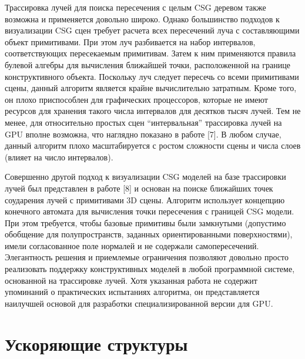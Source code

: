 Трассировка лучей для поиска пересечения с целым CSG деревом также возможна и применяется довольно широко. Однако большинство подходов к визуализации CSG сцен требует расчета всех пересечений луча с составляющими объект примитивами. При этом луч разбивается на набор интервалов, соответствующих пересекаемым примитивам. Затем к ним применяются правила булевой алгебры для вычисления ближайшей точки, расположенной на границе конструктивного объекта. Поскольку луч следует пересечь со всеми примитивами сцены, данный алгоритм является крайне вычислительно затратным. Кроме того, он плохо приспособлен для графических процессоров, которые не имеют ресурсов для хранения такого числа интервалов для десятков тысяч лучей. Тем не менее, для относительно простых сцен “интервальная” трассировка лучей на GPU вполне возможна, что наглядно показано в работе [7]. В любом случае, данный алгоритм плохо масштабируется с ростом сложности сцены и числа слоев (влияет на число интервалов).

Совершенно другой подход к визуализации CSG моделей  на базе трассировки лучей был представлен в работе [8] и основан на поиске ближайших точек соударения лучей с  примитивами 3D сцены. Алгоритм использует концепцию конечного автомата для вычисления точки пересечения с границей CSG модели. При этом требуется, чтобы базовые примитивы были замкнутыми (допустимо обобщение для полупространств, заданных ориентированными поверхностями), имели согласованное поле нормалей и не содержали самопересечений. Элегантность решения и приемлемые ограничения позволяют довольно просто реализовать поддержку конструктивных моделей в любой программной системе, основанной на трассировке лучей. Хотя указанная работа не содержит упоминаний о практических испытаниях алгоритма, он представляется наилучшей основой для разработки специализированной версии для GPU.

\section{Ускоряющие структуры} \label{sect_acceleration_structures}

